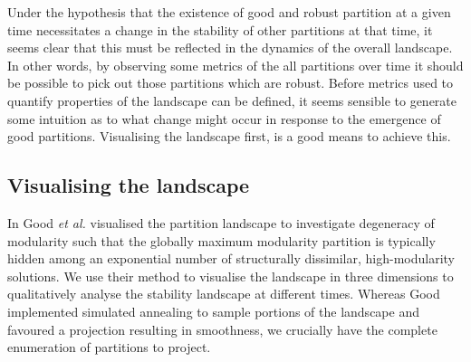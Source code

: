 Under the hypothesis that the existence of good and robust partition at a given time necessitates a change in the stability of other partitions at that time, it seems clear that this must be reflected in the dynamics of the overall landscape.  In other words, by observing some metrics of the all partitions over time it should be possible to pick out those partitions which are robust.  Before metrics used to quantify properties of the landscape can be defined, it seems sensible to generate some intuition as to what change might occur in response to the emergence of good partitions.  Visualising the landscape first, is a good means to achieve this.

\subsection*{Visualising the landscape}
\label{subsec:visland}
In \cite{Good2010} Good \textit{et al.} visualised the partition landscape to investigate degeneracy of modularity such that the globally maximum modularity partition is typically hidden among an exponential number of structurally dissimilar, high-modularity solutions.  We use their method to visualise the landscape in three dimensions to qualitatively analyse the stability landscape at different times.  Whereas Good implemented simulated annealing to sample portions of the landscape and favoured a projection resulting in smoothness, we crucially have the complete enumeration of partitions to project.

